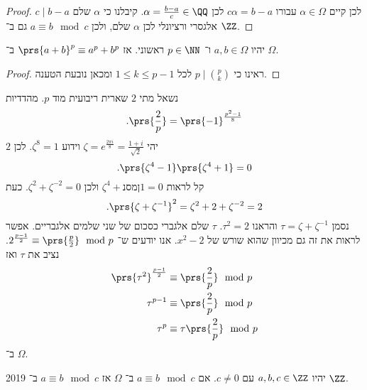\documentclass[a4paper,10pt,twoside,openany]{book}
\begin{document}
\begin{proof}
$c \mid b - a$
לכן קיים
$\alpha \in \Omega$
עבורו
$c\alpha = b - a$
לכן
$\alpha = \frac{b-a}{c} \in \QQ$.
קיבלנו כי
$\alpha$
שלם אלגסרי ורציונלי לכן
$\alpha$
שלם, ולכן
$a \equiv b \mod{c}$
גם ב־
$\ZZ$.
\end{proof}
\begin{proposition}
יהיו
$a,b \in \Omega$
ו־%
$p \in \NN$
ראשוני. אז
$\prs{a+b}^p \equiv a^p + b^p$
ב־%
$\Omega$.
\end{proposition}
\begin{proof}
ראינו כי
$p \mid \binom{p}{k}$
לכל
$1 \leq k \leq p-1$
ומכאן נובעת הטענה.
\end{proof}
\begin{example}
נשאל מתי
$2$
שארית ריבועית מוד
$p$.
מהדדיות
\[\text{.} \prs{\frac{2}{p}} = \prs{-1}^{\frac{p^2 - 1}{8}}\]
$2$
יהי
$\zeta = e^{\frac{2 \pi i}{8}} = \frac{1 + i}{\sqrt{2}}$
וידוע
$\zeta^8 = 1$.
לכן
\[\text{.}\prs{\zeta^4 - 1}\prs{\zeta^4 + 1} = 0\]
קל לראות
$\zeta^4 +נסמן 1 = 0$
ולכן
$\zeta^2 + \zeta^{-2} = 0$.
כעת
\[\text{.} \prs{\zeta + \zeta^{-1}}^2 = \zeta^2 + 2 + \zeta^{-2} = 2\]
נסמן
$\tau = \zeta + \zeta^{-1}$
והראנו
$\tau^2 = 2$.
$\tau$
שלם אלגברי כסכום של שני שלמים אלגבריים. אפשר לראות את זה גם מכיוון שהוא שורש של
$x^2 - 2$.
אנו יודעים ש־%
$2^{\frac{p-1}{2}} \equiv \prs{\frac{p}{2}} \mod{p}$.
נציב את
$\tau$
ואז
\begin{align*}
\prs{\tau^2}^{\frac{p-1}{2}} &\equiv \prs{\frac{2}{p}} \mod{p} \\
\tau^{p-1} &\equiv \prs{\frac{2}{p}} \mod{p} \\
\tau^p &\equiv \tau\prs{\frac{2}{p}} \mod{p}
\end{align*}
ב־%
$\Omega$.
\end{example}

\begin{proposition}
%
{2019}
יהיו
$a,b,c \in \ZZ$
עם
$c \neq 0$.
אם
$a \equiv b \mod{c}$
ב־%
$\Omega$
אז
$a \equiv b \mod{c}$
ב־%
$\ZZ$.
\end{proposition}
\end{document}
